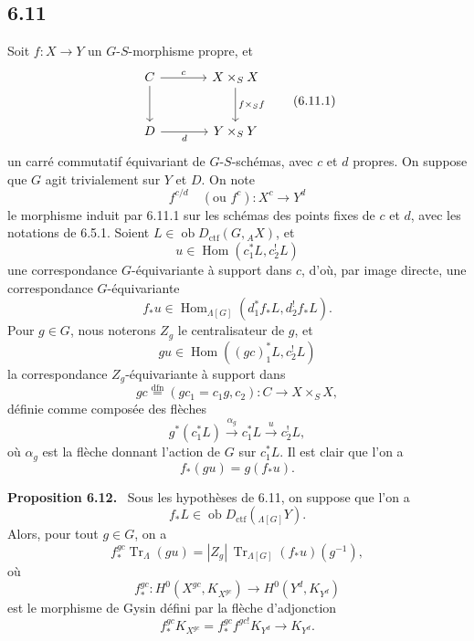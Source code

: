 \documentclass[11pt]{article}
\newenvironment{statement}[1]{\par\medskip\noindent\textbf{#1.}\ }{\par\medskip}
\DeclareMathOperator{\Hom}{Hom}
\providecommand{\Tr}{\operatorname{Tr}}
\providecommand{\Tr}{\operatorname{Tr}}
\providecommand{\Ob}{\operatorname{ob}}
\providecommand{\Tr}{\operatorname{Tr}}
\providecommand{\Hom}{\operatorname{Hom}}
\providecommand{\Ob}{\operatorname{ob}}
\providecommand{\Tr}{\operatorname{Tr}}
\providecommand{\Ob}{\operatorname{Ob}}
\providecommand{\Hom}{\operatorname{Hom}}
\providecommand{\Tr}{\operatorname{Tr}}
\providecommand{\Ob}{\operatorname{ob}}
\providecommand{\Ob}{\operatorname{Ob}}
\begin{document}
\subsection*{6.11}
Soit $f:X\to Y$ un $G$-$S$-morphisme propre, et
\begin{equation}
\begin{tikzcd}[column sep=large,row sep=large]
C \arrow[r,"c"] \arrow[d] & X\times_SX \arrow[d,"f\times_Sf"]\\
D \arrow[r,"d"'] & Y\times_SY
\end{tikzcd}
\tag{6.11.1}
\end{equation}
un carré commutatif équivariant de $G$-$S$-schémas, avec $c$ et $d$ propres. On suppose que $G$ agit trivialement sur $Y$ et $D$. On note
\begin{equation}
f^{c/d}\quad(\text{ou } f^c):X^c\longrightarrow Y^d
\tag{6.11.2}
\end{equation}
le morphisme induit par 6.11.1 sur les schémas des points fixes de $c$ et $d$, avec les notations de 6.5.1. Soient $L\in\Ob D_{\mathrm{ctf}}(G,{}_AX)$, et
\[
u\in\Hom(c_1^*L,c_2^!L)
\]
une correspondance $G$-équivariante à support dans $c$, d'où, par image directe, une correspondance $G$-équivariante
\[
f_*u\in\Hom_{\Lambda[G]}(d_1^*f_*L,d_2^!f_*L).
\]
Pour $g\in G$, nous noterons $Z_g$ le centralisateur de $g$, et
\begin{equation}
gu\in\Hom((gc)_1^*L,c_2^!L)
\tag{6.11.3}
\end{equation}
la correspondance $Z_g$-équivariante à support dans
\begin{equation}
gc\stackrel{\mathrm{dfn}}{=}(gc_1=c_1g,c_2):C\to X\times_SX,
\tag{6.11.4}
\end{equation}
définie comme composée des flèches
\[
g^*(c_1^*L)\xrightarrow{\alpha_g}c_1^*L\xrightarrow{u}c_2^!L,
\]
où $\alpha_g$ est la flèche donnant l'action de $G$ sur $c_1^*L$. Il est clair que l'on a
\begin{equation}
f_*(gu)=g(f_*u).
\tag{6.11.5}
\end{equation}

\begin{statement}{Proposition 6.12}
Sous les hypothèses de 6.11, on suppose que l'on a
\[
f_*L\in\Ob D_{\mathrm{ctf}}({}_{\Lambda[G]}Y).
\]
Alors, pour tout $g\in G$, on a
\begin{equation}
f_*^{gc}\Tr_{\Lambda}(gu)
=
|Z_g|\,\Tr_{\Lambda[G]}(f_*u)(g^{-1}),
\tag{6.12.1}
\end{equation}
où
\[
f_*^{gc}:H^0(X^{gc},K_{X^{gc}})\longrightarrow H^0(Y^d,K_{Y^d})
\]
est le morphisme de Gysin défini par la flèche d'adjonction
\[
f_*^{gc}K_{X^{gc}}=f_*^{gc}f^{gc!}K_{Y^d}\longrightarrow K_{Y^d}.
\]
\end{statement}
\end{document}
